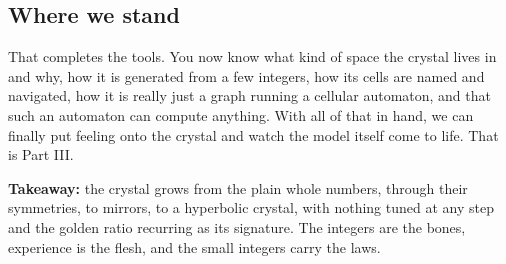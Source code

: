 \subsection{Where we stand}

That completes the tools. You now know what kind of space the crystal lives in and why, how it is generated from a few integers, how its cells are named and navigated, how it is really just a graph running a cellular automaton, and that such an automaton can compute anything. With all of that in hand, we can finally put feeling onto the crystal and watch the model itself come to life. That is Part III.

\textbf{Takeaway:} the crystal grows from the plain whole numbers, through their symmetries, to mirrors, to a hyperbolic crystal, with nothing tuned at any step and the golden ratio recurring as its signature. The integers are the bones, experience is the flesh, and the small integers carry the laws.
